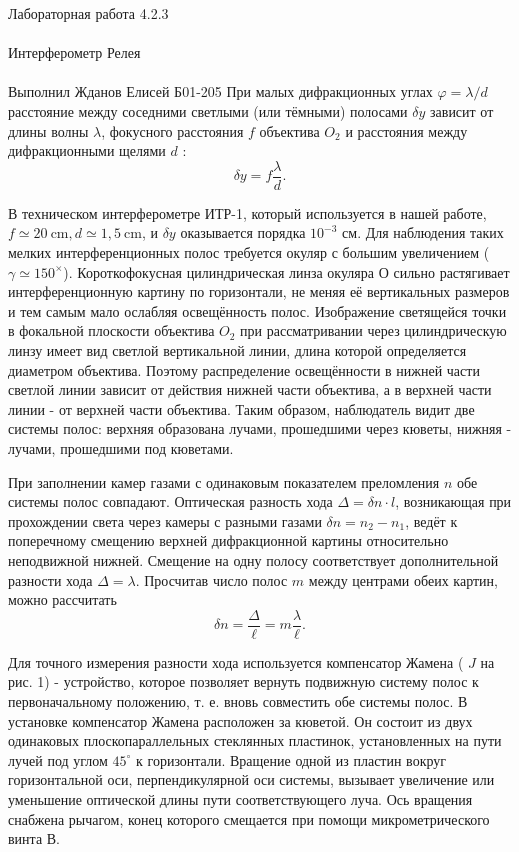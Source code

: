 \documentclass{astroedu-lab}
\begin{document}
\begin{problem}{\huge Лабораторная работа 4.2.3\\\\Интерферометр Релея\\\\Выполнил Жданов Елисей Б01-205}
При малых дифракционных углах $\varphi=\lambda / d$ расстояние между соседними светлыми (или тёмными) полосами $\delta y$ зависит от длины волны $\lambda$, фокусного расстояния $f$ объектива $O_2$ и расстояния между дифракционными щелями $d$ :
$$
\delta y=f \frac{\lambda}{d} .
$$

В техническом интерферометре ИТР-1, который используется в нашей работе, $f \simeq 20 \mathrm{~cm}, d \simeq 1,5 \mathrm{~cm}$, и $\delta y$ оказывается порядка $10^{-3}$ см. Для наблюдения таких мелких интерференционных полос требуется окуляр с большим увеличением ( $\gamma \simeq 150^{\times}$). Короткофокусная цилиндрическая линза окуляра О сильно растягивает интерференционную картину по горизонтали, не меняя её вертикальных размеров и тем самым мало ослабляя освещённость полос. Изображение светящейся точки в фокальной плоскости объектива $O_2$ при рассматривании через цилиндрическую линзу имеет вид светлой вертикальной линии, длина которой определяется диаметром объектива. Поэтому распределение освещённости в нижней части светлой линии зависит от действия нижней части объектива, а в верхней части линии - от верхней части объектива. Таким образом, наблюдатель видит две системы полос: верхняя образована лучами, прошедшими через кюветы, нижняя - лучами, прошедшими под кюветами.

При заполнении камер газами с одинаковым показателем преломления $n$ обе системы полос совпадают. Оптическая разность хода $\Delta=\delta n \cdot l$, возникающая при прохождении света через камеры с разными газами $\delta n=n_2-n_1$, ведёт к поперечному смещению верхней дифракционной картины относительно неподвижной нижней. Смещение на одну полосу соответствует дополнительной разности хода $\Delta=\lambda$. Просчитав число полос $m$ между центрами обеих картин, можно рассчитать
$$
\delta n=\frac{\Delta}{\ell}=m \frac{\lambda}{\ell} .
$$

Для точного измерения разности хода используется компенсатор Жамена ( $J$ на рис. 1) - устройство, которое позволяет вернуть подвижную систему полос к первоначальному положению, т. е. вновь совместить обе системы полос. В установке компенсатор Жамена расположен за кюветой. Он состоит из двух одинаковых плоскопараллельных стеклянных пластинок, установленных на пути лучей под углом $45^{\circ}$ к горизонтали. Вращение одной из пластин вокруг горизонтальной оси, перпендикулярной оси системы, вызывает увеличение или уменьшение оптической длины пути соответствующего луча. Ось вращения снабжена рычагом, конец которого смещается при помощи микрометрического винта В.


\end{problem}
\end{document}
